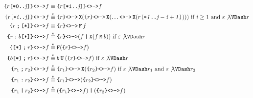 \documentclass[a4paper,twoside,10pt,DIV=12]{scrreprt}
\DeclareMathOperator{\F}{\texttt{F}}
\newcommand{\U}{\mathbin{\texttt{U}}}
\DeclareMathOperator{\X}{\texttt{X}}
\newcommand{\M}{\mathbin{\texttt{M}}}
\newcommand{\OR}{\mathbin{\texttt{|}}}
\newcommand{\FUSION}{\mathbin{\texttt{:}}}
\newcommand{\CONCAT}{\mathbin{\texttt{;}}}
\newcommand{\0}{\texttt{0}}
\newcommand{\1}{\texttt{1}}
\newcommand{\STAR}[1]{\texttt{[*#1]}}
\newcommand{\Esuffix}{\texttt{<>->}}
\newcommand{\sere}[1]{\texttt{\{}#1\texttt{\}}}
\newcommand{\equiV}{\stackrel{\star}{\equiv}}
\newcommand\mvar[1]{\ensuremath{\mathit{#1}}}
\begin{document}
\begin{align*}
  \sere{r\STAR{0..\mvar{j}}}\Esuffix f &\equiv \sere{r\STAR{1..\mvar{j}}}\Esuffix f \\
  \sere{r\STAR{\mvar{i}..\mvar{j}}}\Esuffix f &\equiV
    \sere{r}\Esuffix \X(
    \sere{r}\Esuffix \X(\ldots
    \Esuffix\X(r\STAR{\mvar{1}..\mvar{j-i+1}})))
    \text{~if~}i\ge 1\text{~and~}\varepsilon\not\VDash r\\
  \sere{r\CONCAT \STAR{}}\Esuffix f &\equiv \sere{r}\Esuffix \F f\\
  \sere{r\CONCAT b\STAR{}}\Esuffix f &\equiV \sere{r}\Esuffix (f\OR \X(f \M b)) \text{~if~}\varepsilon\not\VDash r\\
  \sere{\STAR{}\CONCAT r}\Esuffix f &\equiV \F(\sere{r}\Esuffix f)\\
  \sere{b\STAR{}\CONCAT r}\Esuffix f &\equiV b\U(\sere{r}\Esuffix f) \text{~if~}\varepsilon\not\VDash r\\
  \sere{r_1\CONCAT r_2}\Esuffix f &\equiV \sere{r_1}\Esuffix\X(\sere{r_2}\Esuffix f)\text{~if~}\varepsilon\not\VDash r_1\text{~and~}\varepsilon\not\VDash r_2\\
  \sere{r_1\FUSION r_2}\Esuffix f &\equiV \sere{r_1}\Esuffix(\sere{r_2}\Esuffix f)\\
  \sere{r_1\OR r_2}\Esuffix f &\equiV (\sere{r_1}\Esuffix f)\OR(\sere{r_2}\Esuffix f)
\end{align*}
\end{document}

